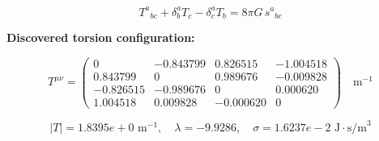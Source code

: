 
\begin{equation}
  T^a{}_{bc} + \delta^a_b T_c - \delta^a_c T_b = 8\pi G \, s^a{}_{bc}
\end{equation}

\textbf{Discovered torsion configuration:}

\begin{equation}
  T^{\mu\nu} = \begin{pmatrix}
    0 & -0.843799 & 0.826515 & -1.004518 \\
    0.843799 & 0 & 0.989676 & -0.009828 \\
    -0.826515 & -0.989676 & 0 & 0.000620 \\
    1.004518 & 0.009828 & -0.000620 & 0
  \end{pmatrix} \quad \text{m}^{-1}
\end{equation}

\begin{equation}
  |T| = 1.8395e+0 \text{ m}^{-1}, \quad
  \lambda = -9.9286, \quad
  \sigma = 1.6237e-2 \text{ J}\cdot\text{s/m}^3
\end{equation}